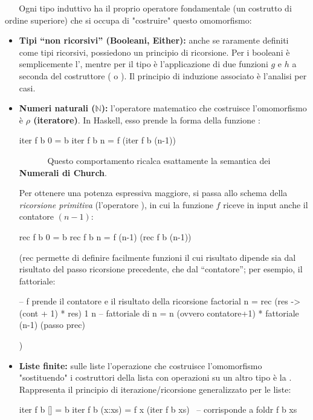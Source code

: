     Ogni tipo induttivo ha il proprio operatore fondamentale (un costrutto di ordine superiore) che si occupa di "costruire" questo omomorfismo:
    \begin{itemize}
    \item \textbf{Tipi ``non ricorsivi'' (Booleani, Either):} anche se raramente definiti come tipi ricorsivi, possiedono un principio di ricorsione. Per i booleani è semplicemente l', mentre per il tipo  è l'applicazione di due funzioni $g$ e $h$ a seconda del costruttore ( o ). Il principio di induzione associato è l'analisi per casi.
        
        \item \textbf{Numeri naturali ($\mathbb{N}$):} l'operatore matematico che costruisce l'omomorfismo è \textbf{$\rho$ (iteratore)}. In Haskell, esso prende la forma della funzione :
        \begin{haskellbox}{}
iter f b 0 = b
iter f b n = f (iter f b (n-1))
\end{haskellbox}

        Questo comportamento ricalca esattamente la semantica dei \textbf{Numerali di Church}. 

Per ottenere una potenza espressiva maggiore, si passa allo schema della \textit{ricorsione primitiva} (l'operatore ), in cui la funzione $f$ riceve in input anche il contatore $(n-1)$:

\begin{haskellbox}{}
rec f b 0 = b
rec f b n = f (n-1) (rec f b (n-1))
\end{haskellbox}

(rec permette di definire facilmente funzioni il cui risultato dipende sia dal risultato del passo ricorsione precedente, che dal ``contatore''; per esempio, il fattoriale:
\begin{haskellbox}{}
    -- f prende il contatore e il risultato della ricorsione
factorial n = rec (\cont res -> (cont + 1) * res) 1 n
    -- fattoriale di n = n (ovvero contatore+1) * fattoriale (n-1) (passo prec)
\end{haskellbox}
)
        
        \item \textbf{Liste finite:} sulle liste l'operazione che costruisce l'omomorfismo "sostituendo" i costruttori della lista con operazioni su un altro tipo è la . Rappresenta il principio di iterazione/ricorsione generalizzato per le liste:
    \begin{haskellbox}{}
iter f b [] = b
iter f b (x:xs) = f x (iter f b xs)  -- corrisponde a foldr f b xs
    \end{haskellbox}
    \end{itemize}

